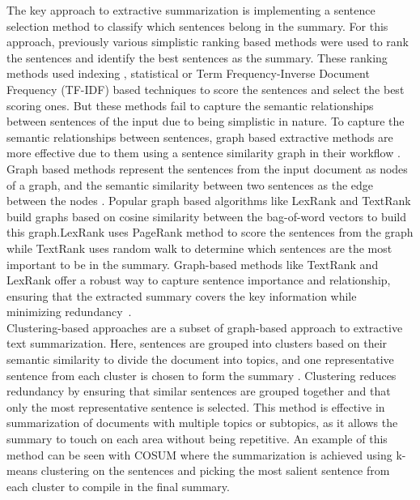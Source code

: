 The key approach to extractive summarization is implementing a sentence selection method to classify which sentences belong in the summary. For this approach, previously various simplistic ranking based methods were used to rank the sentences and identify the best sentences as the summary. These ranking methods used indexing \cite{Baxendale_1958_firstsummarization}, statistical \cite{edmundson_1969_earlysum} or Term Frequency-Inverse Document Frequency (TF-IDF) \cite{das-2022-tfidf,sarkar-2012-tfidf-2,sarkar-2012-tfidf} based techniques to score the sentences and  select the best scoring ones. But these methods fail to capture the semantic relationships between sentences of the input due to being simplistic in nature. To capture the semantic relationships between sentences, graph based extractive methods are more effective due to them using a sentence similarity graph in their workflow \cite{wafaa-2021-summary-comprehensive-review}. Graph based methods represent the sentences from the input document as nodes of a graph, and the semantic similarity between two sentences as the edge between the nodes \cite{moratanch-2017-extractive-review}. Popular graph based algorithms like LexRank \cite{Erkan-lexRank-2004} and TextRank \cite{mihalcea-2004-textrank} build graphs based on cosine similarity between the bag-of-word vectors to build this graph.LexRank uses PageRank \cite{page-PageRank-1999} method to score the sentences from the graph while TextRank uses random walk to determine which sentences are the most important to be in the summary. Graph-based methods like TextRank and LexRank offer a robust way to capture sentence importance and relationship, ensuring that the extracted summary covers the key information while minimizing redundancy~\cite{wafaa-2021-summary-comprehensive-review}.\\  

Clustering-based approaches are a subset of graph-based approach to extractive text summarization. Here, sentences are grouped into clusters based on their semantic similarity to divide the document into topics, and one representative sentence from each cluster is chosen to form the summary \cite{Mohan-2022-topic-modeling-rev-clustering}. Clustering reduces redundancy by ensuring that similar sentences are grouped together and that only the most representative sentence is selected. This method is effective in summarization of documents with multiple topics or subtopics, as it allows the summary to touch on each area without being repetitive. An example of this method can be seen with COSUM \cite{alguliyev-2019-cosum} where the summarization is achieved using k-means clustering on the sentences and picking the most salient sentence from each cluster to compile in the final summary.\\

